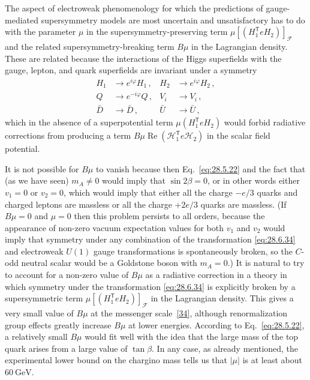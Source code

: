 The aspect of electroweak phenomenology for which the predictions of
gauge-mediated supersymmetry models are most uncertain and unsatisfactory
has to do with the parameter \(\mu\) in the supersymmetry-preserving term
\(\mu[(H_1^{\mathsf T}eH_2)]_{\mathcal{F}}\) and the related
supersymmetry-breaking term \(B\mu\) in the Lagrangian density. These are
related because the interactions of the Higgs superfields with the gauge,
lepton, and quark superfields are invariant under a symmetry
\begin{equation}
  \begin{aligned}
    H_1&\longrightarrow e^{i\varphi}H_1\,,
      &H_2&\longrightarrow e^{i\varphi}H_2\,,\\
    Q&\longrightarrow e^{-i\varphi}Q\,,
      &V_i&\longrightarrow V_i\,,\\
    \bar D&\longrightarrow\bar D\,,
      &\bar U&\longrightarrow\bar U\,,
  \end{aligned}
  \tag{28.6.34}\label{eq:28.6.34}
\end{equation}
which in the absence of a superpotential term
\(\mu(H_1^{\mathsf T}eH_2)\) would forbid radiative corrections from
producing a term
\(B\mu\operatorname{Re}(\mathcal{H}_1^{\mathsf T}e\mathcal{H}_2)\) in
the scalar field potential.

It is not possible for \(B\mu\) to vanish because then
Eq.~\eqref{eq:28.5.22} and the fact that (as we have seen) \(m_A\neq0\)
would imply that \(\sin2\beta=0\), or in other words either \(v_1=0\) or
\(v_2=0\), which would imply that either all the charge \(-e/3\) quarks
and charged leptons are massless or all the charge \(+2e/3\) quarks are
massless. (If \(B\mu=0\) and \(\mu=0\) then this problem persists to all
orders, because the appearance of non-zero vacuum expectation values for
both \(v_1\) and \(v_2\) would imply that symmetry under any combination
of the transformation \eqref{eq:28.6.34} and electroweak \(U(1)\) gauge
transformations is spontaneously broken, so the \(C\)-odd neutral scalar
would be a Goldstone boson with \(m_A=0\).) It is natural to try to account
for a non-zero value of \(B\mu\) as a radiative correction in a theory in
which symmetry under the transformation \eqref{eq:28.6.34} is explicitly
broken by a supersymmetric term
\(\mu[(H_1^{\mathsf T}eH_2)]_{\mathcal{F}}\) in the Lagrangian density.
This gives a very small value of \(B\mu\) at the messenger
scale~\hyperref[ch28-ref-34]{[34]}, although renormalization group effects
greatly increase \(B\mu\) at lower energies. According to
Eq.~\eqref{eq:28.5.22}, a relatively small \(B\mu\) would fit well with
the idea that the large mass of the top quark arises from a large value of
\(\tan\beta\). In any case, as already mentioned, the experimental lower
bound on the chargino mass tells us that \(\lvert\mu\rvert\) is at least
about \(60\ \mathrm{GeV}\).

